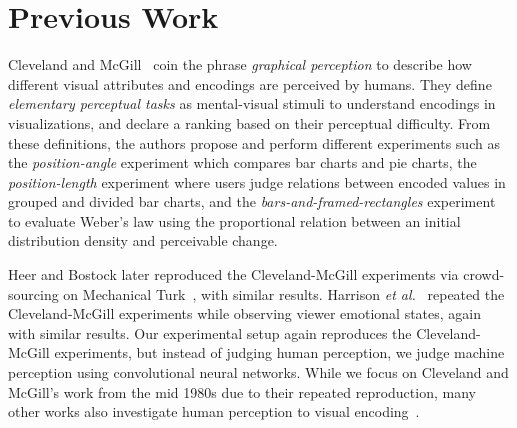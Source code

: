 \section{Previous Work}

 Cleveland and McGill~\cite{cleveland_mcgill,cleveland1985graphical} coin the phrase \emph{graphical perception} to describe how different visual attributes and encodings are perceived by humans. They define \emph{elementary perceptual tasks} as mental-visual stimuli to understand encodings in visualizations, and declare a ranking based on their perceptual difficulty. From these definitions, the authors propose and perform different experiments such as the \emph{position-angle} experiment which compares bar charts and pie charts, the \emph{position-length} experiment where users judge relations between encoded values in grouped and divided bar charts, and the \emph{bars-and-framed-rectangles} experiment to evaluate Weber's law \cite{harrison2014_webers_law_rank} using the proportional relation between an initial distribution density and perceivable change.

Heer and Bostock later reproduced the Cleveland-McGill experiments via crowd-sourcing on Mechanical Turk~\cite{HeerBostock2010}, with similar results. Harrison \textit{et al.}~\cite{harrison2013influencing} repeated the Cleveland-McGill experiments while observing viewer emotional states, again with similar results. Our experimental setup again reproduces the Cleveland-McGill experiments, but instead of judging human perception, we judge machine perception using convolutional neural networks. While we focus on Cleveland and McGill's work from the mid 1980s due to their repeated reproduction, many other works also investigate human perception to visual encoding~\cite{bertin1967semiologie,treisman1988feature,carpendale2003considering,wilkinson2006grammar,widgor_perception2007,munzner2015visualization}.



